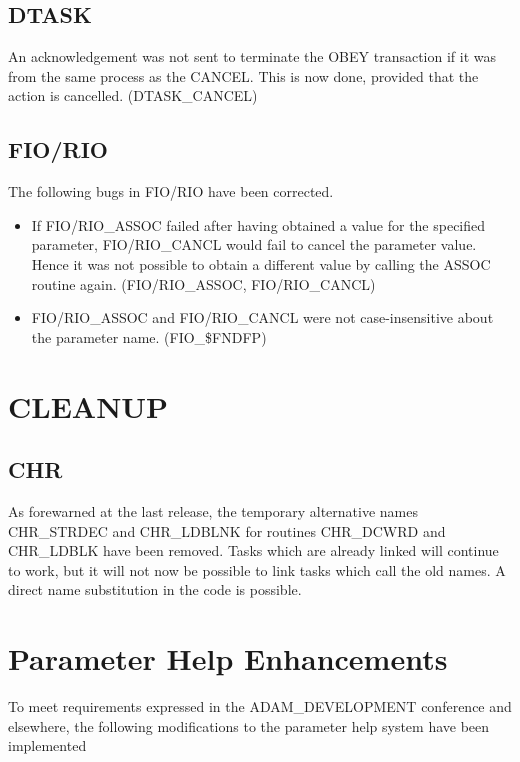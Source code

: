\subsection{DTASK}
An acknowledgement was not sent to terminate the OBEY transaction if it was
from the same process as the CANCEL. This is now done, provided that the
action is cancelled. (DTASK\_CANCEL)

\subsection{FIO/RIO}
The following bugs in FIO/RIO have been corrected.
\begin{itemize}
\item If FIO/\-RIO\-\_ASSOC failed after having obtained a value for the 
specified parameter, FIO/\-RIO\-\_CANCL would fail to cancel the parameter 
value. 
Hence it was not possible to obtain a different value by calling the ASSOC 
routine again. (FIO/\-RIO\-\_ASSOC, FIO/\-RIO\-\_CANCL)
\item FIO/\-RIO\-\_ASSOC and FIO/\-RIO\-\_CANCL were not case-insensitive 
about the parameter name. (FIO\_\$FNDFP)
\end{itemize}

\section{CLEANUP}
\subsection{CHR}
\label{cleanchr}
As forewarned at the last release,
the temporary alternative names CHR\-\_STRDEC and CHR\-\_LDBLNK for routines 
CHR\-\_DCWRD and CHR\-\_LDBLK have been removed.
Tasks which are already linked will continue to work, but it will not now
be possible to link tasks which call the old names.
A direct name substitution in the code is possible.

\appendix
\newpage
\section{Parameter Help Enhancements}
\label{parhelp}
To meet requirements expressed in the ADAM\_DEVELOPMENT conference and
elsewhere, the following modifications to the parameter help system have
been implemented

